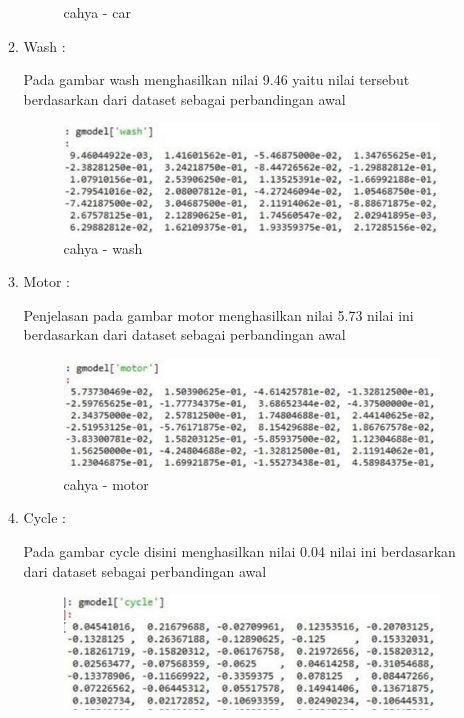 \begin{enumerate}
\begin{enumerate}
\begin{figure}[!hbtp]
\caption{cahya - car}
\label{ cahya - car}
\end{figure}
\par
\item Wash :  
\par Pada gambar wash menghasilkan nilai 9.46 yaitu nilai tersebut berdasarkan dari dataset sebagai perbandingan awal
\par
\begin{figure}[!hbtp]
\centering
\includegraphics[scale=0.2]{figures/cahya-wash.jpg}
\caption{cahya - wash}
\label{ cahya - wash}
\end{figure}
\par
\item Motor :  
\par Penjelasan pada gambar motor  menghasilkan nilai 5.73  nilai ini  berdasarkan dari dataset sebagai perbandingan awal
\par
\begin{figure}[!hbtp]
\centering
\includegraphics[scale=0.2]{figures/cahya-motor.jpg}
\caption{ cahya - motor}
\label{cahya - motor}
\end{figure}
\par
\item Cycle :  
\par Pada gambar cycle disini menghasilkan nilai 0.04 nilai ini berdasarkan dari dataset sebagai perbandingan awal
\par
\begin{figure}[!hbtp]
\centering
\includegraphics[scale=0.2]{figures/cahya-cycle.jpg}

\end{figure}
\end{enumerate}
\end{enumerate}
